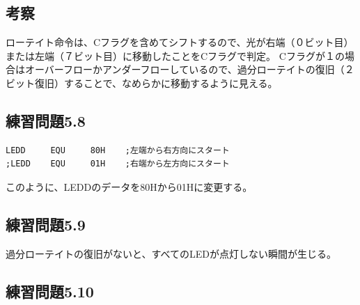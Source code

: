 \documentclass[a4paper,12pt]{ujarticle}
\begin{document}
  \subsection{考察}
  ローテイト命令は、Cフラグを含めてシフトするので、光が右端（０ビット目）または左端（７ビット目）に移動したことをCフラグで判定。
  Cフラグが１の場合はオーバーフローかアンダーフローしているので、過分ローテイトの復旧（２ビット復旧）することで、なめらかに移動するように見える。
  \subsection{練習問題5.8}
  \begin{lstlisting}[basicstyle=\ttfamily\footnotesize, frame=single]
LEDD     EQU     80H    ;左端から右方向にスタート
;LEDD    EQU     01H    ;右端から左方向にスタート
  \end{lstlisting}
  このように、LEDDのデータを80Hから01Hに変更する。
  \subsection{練習問題5.9}
  過分ローテイトの復旧がないと、すべてのLEDが点灯しない瞬間が生じる。
  \subsection{練習問題5.10}
  \clearpage
\end{document}

